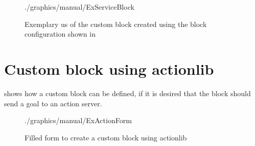 \begin{figure}[hbp]
	
\end{figure}

\begin{figure}[htbp]
	\centering
	\begin{overpic}[width=0.5\linewidth]{./graphics/manual/ExServiceBlock}
	\end{overpic}
	\caption{Exemplary us of the custom block created using the block configuration shown in }%
	\label{fig:ExServiceBlock}%
\end{figure}

\section*{Custom block using actionlib}
 shows how a custom block can be defined, if it is desired that the block should send a goal to an action server.

\begin{figure}[htbp]
	\centering
	\begin{overpic}[width=\linewidth]{./graphics/manual/ExActionForm}
	\end{overpic}
	\caption{Filled form to create a custom block using actionlib}%
	\label{fig:ExActionForm}%
\end{figure}